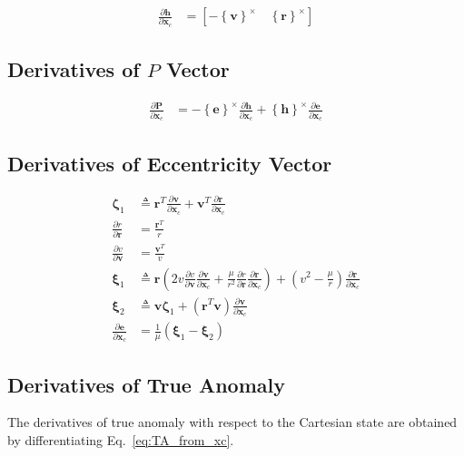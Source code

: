 \documentclass[]{article}
\newcommand{\vb}[1]{\bm{#1}} %
\newcommand{\pd}[2]{\frac{\partial #1}{\partial #2}} %
\newcommand{\crossmat}[1]{\left\{ {#1} \right\}^{\times}} %
\newcommand{\xc}[0]{\vb{x}_c}
\begin{document}
\begin{align}
	\pd{\vb{h}}{\xc} &= \left[ -\crossmat{\vb{v}} \quad \crossmat{\vb{r}} \right]
\end{align}

\subsection{Derivatives of $P$ Vector}

\begin{align}
\pd{\vb{P}}{\xc} &= - \crossmat{\vb{e}} \pd{\vb{h}}{\xc} + \crossmat{\vb{h}} \pd{\vb{e}}{\xc}
\end{align}

\subsection{Derivatives of Eccentricity Vector}

\begin{align}
\vb{\zeta}_1 &\triangleq \vb{r}^T \pd{\vb{v}}{\xc} + \vb{v}^T \pd{\vb{r}}{\xc} \\
\pd{r}{\vb{r}} &= \frac{\vb{r}^T}{r} \\
\pd{v}{\vb{v}} &= \frac{\vb{v}^T}{v} \\
\vb{\xi}_1 &\triangleq \vb{r} \left( 2 v \pd{v}{\vb{v}} \pd{\vb{v}}{\xc} + \frac{\mu}{r^2} \pd{r}{\vb{r}} \pd{\vb{r}}{\xc} \right) + \left( v^2 - \frac{\mu}{r} \right) \pd{\vb{r}}{\xc} \\
\vb{\xi}_2 &\triangleq \vb{v} \vb{\zeta}_1 + \left( \vb{r}^T \vb{v} \right) \pd{\vb{v}}{\xc}  \\
\pd{\vb{e}}{\xc} &= \frac{1}{\mu} \left( \vb{\xi}_1 - \vb{\xi}_2 \right)
\end{align}

\subsection{Derivatives of True Anomaly}

The derivatives of true anomaly with respect to the Cartesian state are obtained by differentiating Eq.~\eqref{eq:TA_from_xc}.
\end{document}
